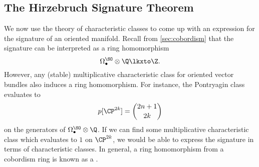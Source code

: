 %
%
%
%

\subsection{The Hirzebruch Signature Theorem}

We now use the theory of characteristic classes to come up with an expression for the signature of an oriented manifold. Recall from \cref{sec:cobordism} that the signature can be interpreted as a ring homomorphism
\[
		\Omega_\bullet^\SO \otimes \Q \lkxto \Z.
\]
However, any (stable) multiplicative characteristic class for oriented vector bundles also induces a ring homomorphism. For instance, the Pontryagin class evaluates to
\[
		p[\CP^{2k}] = \binom{2n+1}{2k}
\]
on the generators of $\Omega_\bullet^\SO\otimes \Q$. If we can find some multiplicative characteristic class which evaluates to $1$ on $\CP^{2k}$, we would be able to express the signature in terms of characteristic classes. In general, a ring homomorphism from a cobordism ring is known as a .

